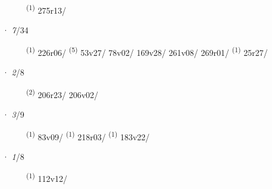 \begin{description}
    \item[]  \textsuperscript{(1)} \mbox{275r13/}
\end{description}
\ENTRYEND
\noindent{} · \textit{7}/34 \LEMMALINE
\begin{description}
    \item[]  \textsuperscript{(1)} \mbox{226r06/} \CASEBREAK {} \textsuperscript{(5)} \mbox{53v27/} \mbox{78v02/} \mbox{169v28/} \mbox{261v08/} \mbox{269r01/} \CASEBREAK {} \textsuperscript{(1)} \mbox{25r27/}
\end{description}
\ENTRYEND
\noindent{} · \textit{2}/8 \LEMMALINE
\begin{description}
    \item[]  \textsuperscript{(2)} \mbox{206r23/} \mbox{206v02/}
\end{description}
\ENTRYEND
\noindent{} · \textit{3}/9 \LEMMALINE
\begin{description}
    \item[]  \textsuperscript{(1)} \mbox{83v09/} \textsuperscript{(1)} \mbox{218r03/} \CASEBREAK {} \textsuperscript{(1)} \mbox{183v22/}
\end{description}
\ENTRYEND
\noindent{} · \textit{1}/8 \LEMMALINE
\begin{description}
    \item[]  \textsuperscript{(1)} \mbox{112v12/}
\end{description}
\ENTRYEND
